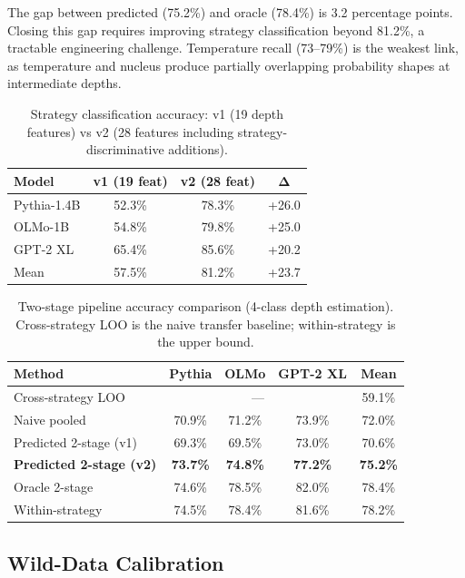 \documentclass[11pt,a4paper]{article}
\begin{document}
The gap between predicted (75.2\%) and oracle (78.4\%) is 3.2 percentage points. Closing this gap requires improving strategy classification beyond 81.2\%, a tractable engineering challenge. Temperature recall (73--79\%) is the weakest link, as temperature and nucleus produce partially overlapping probability shapes at intermediate depths.

\begin{table}[t]
\centering
\caption{Strategy classification accuracy: v1 (19 depth features) vs v2 (28 features including strategy-discriminative additions).}
\label{tab:strategy_clf}
\small
\begin{tabular}{lccc}
\toprule
\textbf{Model} & \textbf{v1 (19 feat)} & \textbf{v2 (28 feat)} & $\boldsymbol{\Delta}$ \\
\midrule
Pythia-1.4B & 52.3\% & 78.3\% & +26.0 \\
OLMo-1B & 54.8\% & 79.8\% & +25.0 \\
GPT-2 XL & 65.4\% & 85.6\% & +20.2 \\
\midrule
Mean & 57.5\% & 81.2\% & +23.7 \\
\bottomrule
\end{tabular}
\end{table}

\begin{table}[t]
\centering
\caption{Two-stage pipeline accuracy comparison (4-class depth estimation). Cross-strategy LOO is the naive transfer baseline; within-strategy is the upper bound.}
\label{tab:pipeline}
\small
\begin{tabular}{lcccc}
\toprule
\textbf{Method} & \textbf{Pythia} & \textbf{OLMo} & \textbf{GPT-2 XL} & \textbf{Mean} \\
\midrule
Cross-strategy LOO & \multicolumn{3}{c}{---} & 59.1\% \\
Naive pooled & 70.9\% & 71.2\% & 73.9\% & 72.0\% \\
Predicted 2-stage (v1) & 69.3\% & 69.5\% & 73.0\% & 70.6\% \\
\textbf{Predicted 2-stage (v2)} & \textbf{73.7\%} & \textbf{74.8\%} & \textbf{77.2\%} & \textbf{75.2\%} \\
Oracle 2-stage & 74.6\% & 78.5\% & 82.0\% & 78.4\% \\
Within-strategy & 74.5\% & 78.4\% & 81.6\% & 78.2\% \\
\bottomrule
\end{tabular}
\end{table}

\subsection{Wild-Data Calibration}
\label{sec:wild}
\end{document}
